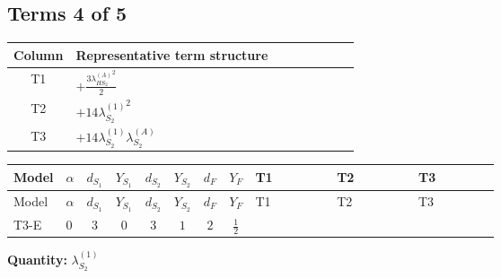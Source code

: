 \documentclass[8pt]{article}
\begin{document}
\begin{landscape}
\subsection*{Terms 4 of 5}
\begin{center}
\begin{tabular}{@{}c >{\raggedright\arraybackslash}p{0.82\linewidth}@{}}
\toprule
Column & Representative term structure \\
\midrule
T1 & \(\displaystyle +\frac{3 {\lambda_{HS_2}^{(A)}}^2}{2}\) \\
\midrule
T2 & \(\displaystyle +14 {\lambda_{S_2}^{(1)}}^2\) \\
\midrule
T3 & \(\displaystyle +14 {\lambda_{S_2}^{(1)}} {\lambda_{S_2}^{(A)}}\) \\
\midrule
\bottomrule
\end{tabular}
\end{center}
\smallskip
\tiny
\begin{longtable}{@{}llcccccc >{\raggedright\arraybackslash}p{0.21\linewidth} >{\raggedright\arraybackslash}p{0.21\linewidth} >{\raggedright\arraybackslash}p{0.21\linewidth}@{}}
\toprule
Model & $\alpha$ & $d_{S_1}$ & $Y_{S_1}$ & $d_{S_2}$ & $Y_{S_2}$ & $d_F$ & $Y_F$ & T1 & T2 & T3 \\
\midrule
\endfirsthead
\toprule
Model & $\alpha$ & $d_{S_1}$ & $Y_{S_1}$ & $d_{S_2}$ & $Y_{S_2}$ & $d_F$ & $Y_F$ & T1 & T2 & T3 \\
\midrule
\endhead
T3-E & $0$ & $3$ & $0$ & $3$ & $1$ & $2$ & $\frac{1}{2}$ & \scriptsize\adjustbox{max width=\linewidth}{$\begin{gathered} +\frac{3 {\lambda_{HS_2}^{(A)}}^2}{2}\end{gathered}$} & \scriptsize\adjustbox{max width=\linewidth}{$\begin{gathered} +14 {\lambda_{S_2}^{(1)}}^2\end{gathered}$} & \scriptsize\adjustbox{max width=\linewidth}{$\begin{gathered} +14 {\lambda_{S_2}^{(1)}} {\lambda_{S_2}^{(A)}}\end{gathered}$} \\
\midrule
\bottomrule
\end{longtable}
\clearpage
\noindent\textbf{Quantity: }$\lambda_{S_2}^{(1)}$\par\smallskip

\end{landscape}
\end{document}

